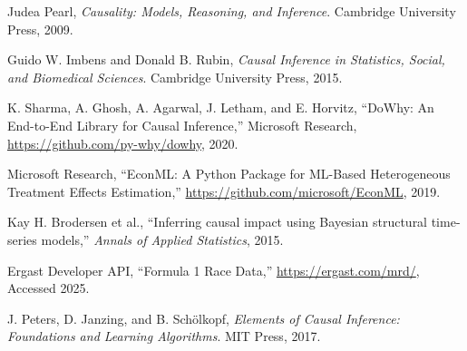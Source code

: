 \documentclass[12pt]{book}
\begin{document}
\begin{thebibliography}{9}

Judea Pearl,
\textit{Causality: Models, Reasoning, and Inference}. 
Cambridge University Press, 2009.

Guido W. Imbens and Donald B. Rubin,
\textit{Causal Inference in Statistics, Social, and Biomedical Sciences}.
Cambridge University Press, 2015.

K. Sharma, A. Ghosh, A. Agarwal, J. Letham, and E. Horvitz, 
“DoWhy: An End-to-End Library for Causal Inference,” 
Microsoft Research, \url{https://github.com/py-why/dowhy}, 2020.

Microsoft Research, 
“EconML: A Python Package for ML-Based Heterogeneous Treatment Effects Estimation,” 
\url{https://github.com/microsoft/EconML}, 2019.

Kay H. Brodersen et al.,
“Inferring causal impact using Bayesian structural time-series models,” 
\textit{Annals of Applied Statistics}, 2015.

Ergast Developer API, 
“Formula 1 Race Data,” 
\url{https://ergast.com/mrd/}, Accessed 2025.

J. Peters, D. Janzing, and B. Schölkopf,
\textit{Elements of Causal Inference: Foundations and Learning Algorithms}.
MIT Press, 2017.

\end{thebibliography}
\end{document}

